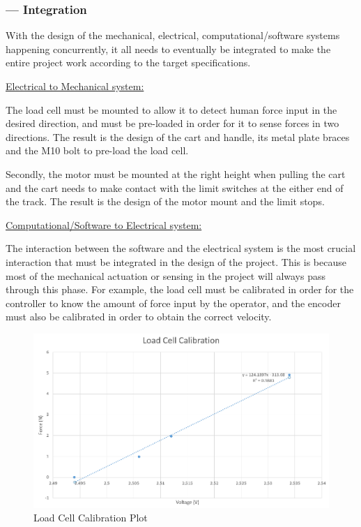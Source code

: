 \subsubsection*{ --- Integration}\par
With the design of the mechanical, electrical, computational/software systems happening concurrently, it all needs to eventually be integrated to make the entire project work according to the target specifications.\par
\vspace{.167in}
\noindent\underline{Electrical to Mechanical system:}\par
\vspace{.08in}
The load cell must be mounted to allow it to detect human force input in the desired direction, and must be pre-loaded in order for it to sense forces in two directions. The result is the design of the cart and handle, its metal plate braces and the M10 bolt to pre-load the load cell.\par
Secondly, the motor must be mounted at the right height when pulling the cart and the cart needs to make contact with the limit switches at the either end of the track. The result is the design of the motor mount and the limit stops.\par
\vspace{.167in}
\noindent\underline{Computational/Software to Electrical system:} \par
\vspace{.08in}
The interaction between the software and the electrical system is the most crucial interaction that must be integrated in the design of the project. This is because most of the mechanical actuation or sensing in the project will always pass through this phase. For example, the load cell must be calibrated in order for the controller to know the amount of force input by the operator, and the encoder must also be calibrated in order to obtain the correct velocity. \par
\begin{figure}[H]
\begin{center}
\includegraphics[width=1\linewidth]{Images/load_cell_cali.PNG}
\caption{Load Cell Calibration Plot}
\label{LC_cali}
\end{center}
\end{figure}
